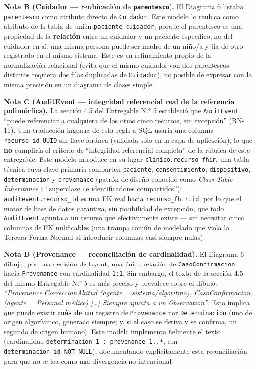 \documentclass[11pt,a4paper]{article}
\begin{document}
\textbf{Nota B (Cuidador --- reubicación de \texttt{parentesco}).} El Diagrama 6 listaba \texttt{parentesco} como atributo directo de \texttt{Cuidador}. Este modelo lo reubica como atributo de la tabla de unión \texttt{paciente\_cuidador}, porque el parentesco es una propiedad de la \textbf{relación} entre un cuidador y un paciente específico, no del cuidador en sí: una misma persona puede ser madre de un niño/a y tía de otro registrado en el mismo sistema. Este es un refinamiento propio de la normalización relacional (evita que el mismo cuidador con dos parentescos distintos requiera dos filas duplicadas de \texttt{Cuidador}), no posible de expresar con la misma precisión en un diagrama de clases simple.

\textbf{Nota C (AuditEvent --- integridad referencial real de la referencia polimórfica).} La sección 4.5 del Entregable N.° 5 estableció que \texttt{AuditEvent} ``puede referenciar a cualquiera de los otros cinco recursos, sin excepción'' (RN-11). Una traducción ingenua de esta regla a SQL usaría una columna \texttt{recurso\_id\ UUID} sin llave foránea (validada solo en la capa de aplicación), lo que \textbf{no} cumpliría el criterio de ``integridad referencial completa'' de la rúbrica de este entregable. Este modelo introduce en su lugar \texttt{clinico.recurso\_fhir}, una tabla técnica cuya clave primaria comparten \texttt{paciente}, \texttt{consentimiento}, \texttt{dispositivo}, \texttt{determinacion} y \texttt{provenance} (patrón de diseño conocido como \emph{Class Table Inheritance} o ``superclase de identificadores compartidos''): \texttt{auditevent.recurso\_id} es una FK real hacia \texttt{recurso\_fhir.id}, por lo que el motor de base de datos garantiza, sin posibilidad de excepción, que todo \texttt{AuditEvent} apunta a un recurso que efectivamente existe --- sin necesitar cinco columnas de FK nulificables (una trampa común de modelado que viola la Tercera Forma Normal al introducir columnas casi siempre nulas).

\textbf{Nota D (Provenance --- reconciliación de cardinalidad).} El Diagrama 6 dibuja, por una decisión de layout, una única relación de \texttt{CasoConfirmacion} hacia \texttt{Provenance} con cardinalidad \texttt{1:1}. Sin embargo, el texto de la sección 4.5 del mismo Entregable N.° 5 es más preciso y prevalece sobre el dibujo: \emph{``Provenance \textbar{} CorreccionAltitud (agente = sistema/algoritmo), CasoConfirmacion (agente = Personal médico) {[}\ldots{]} Siempre apunta a un Observation''}. Esto implica que puede existir \textbf{más de un} registro de \texttt{Provenance} por \texttt{Determinacion} (uno de origen algorítmico, generado siempre; y, si el caso se deriva y se confirma, un segundo de origen humano). Este modelo implementa fielmente el texto (cardinalidad \texttt{determinacion\ 1\ :\ provenance\ 1..*}, con \texttt{determinacion\_id\ NOT\ NULL}), documentando explícitamente esta reconciliación para que no se lea como una divergencia no intencional.
\end{document}
